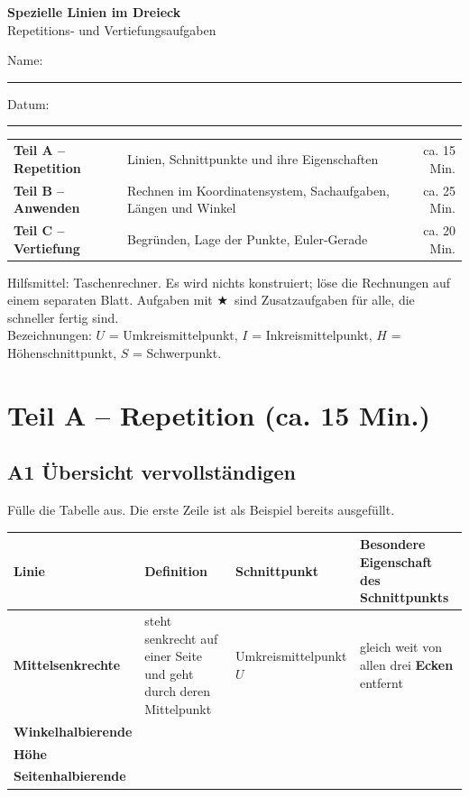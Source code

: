 \documentclass[11pt,a4paper]{article}
\renewcommand{\arraystretch}{1.25}
\newcommand{\stern}{$\bigstar$\ }
\begin{document}
{\LARGE\bfseries Spezielle Linien im Dreieck}\\[2pt]
{\large Repetitions- und Vertiefungsaufgaben}

\vspace{8pt}
Name: \rule{6cm}{0.4pt}\hfill Datum: \rule{3.5cm}{0.4pt}

\vspace{6pt}
\begin{tabularx}{\linewidth}{>{\bfseries}l L r}
\hline
Teil A -- Repetition & Linien, Schnittpunkte und ihre Eigenschaften & ca. 15 Min. \\
Teil B -- Anwenden & Rechnen im Koordinatensystem, Sachaufgaben, L\"angen und Winkel & ca. 25 Min. \\
Teil C -- Vertiefung & Begr\"unden, Lage der Punkte, Euler-Gerade & ca. 20 Min. \\
\hline
\end{tabularx}

\small
Hilfsmittel: Taschenrechner. Es wird nichts konstruiert; l\"ose die Rechnungen auf einem separaten Blatt.
Aufgaben mit \stern sind Zusatzaufgaben f\"ur alle, die schneller fertig sind.\\
Bezeichnungen: $U$ = Umkreismittelpunkt, $I$ = Inkreismittelpunkt, $H$ = H\"ohenschnittpunkt, $S$ = Schwerpunkt.
\normalsize

\section{Teil A -- Repetition (ca. 15 Min.)}

\subsection{A1 \quad \"Ubersicht vervollst\"andigen}
F\"ulle die Tabelle aus. Die erste Zeile ist als Beispiel bereits ausgef\"ullt.

\vspace{2pt}
\renewcommand{\arraystretch}{1.4}
\begin{tabularx}{\linewidth}{|>{\bfseries}P{3.3cm}|L|P{3.1cm}|L|}
\hline
Linie & \textbf{Definition} & \textbf{Schnittpunkt} & \textbf{Besondere Eigenschaft des Schnittpunkts} \\ \hline
Mittelsenkrechte & steht senkrecht auf einer Seite und geht durch deren Mittelpunkt & Umkreis\-mittelpunkt $U$ & gleich weit von allen drei \textbf{Ecken} entfernt \\ \hline
Winkel\-halbierende & & & \\[1.4cm] \hline
H\"ohe & & & \\[1.4cm] \hline
Seiten\-halbierende & & & \\[1.4cm] \hline
\end{tabularx}
\renewcommand{\arraystretch}{1.25}
\end{document}
